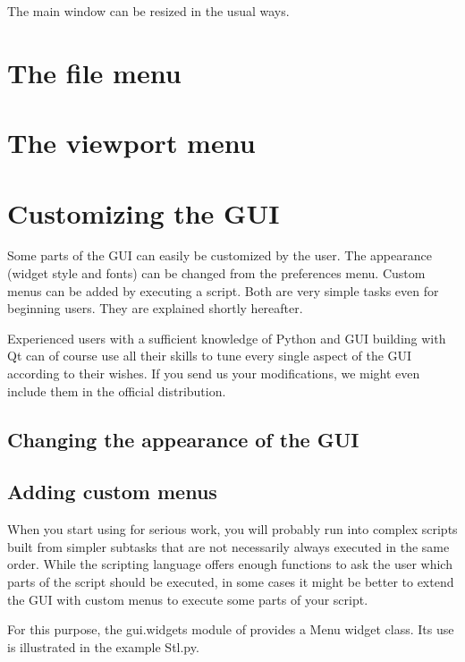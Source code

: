The \pyf main window can be resized in the usual ways. 

   
\section{The file menu}
\label{sec:file-menu}


   
\section{The viewport menu}
\label{sec:viewport-menu}



\section{Customizing the GUI}
\label{sec:customize-gui}

Some parts of the \pyformex GUI can easily be customized by the user. 
The appearance (widget style and fonts) can be changed from the preferences menu. Custom menus can be added by executing a script. Both are very simple tasks even for beginning users. They are explained shortly hereafter.

Experienced users with a sufficient knowledge of Python and GUI building with Qt can of course use all their skills to tune every single aspect of the \pyformex GUI according to their wishes. If you send us your modifications, we might even include them in the official distribution.


\subsection{Changing the appearance of the GUI}
\label{sec:chang-appe-gui}


\subsection{Adding custom menus}
\label{sec:adding-custom-menus}

When you start using \pyformex for serious work, you will probably run into complex scripts built from simpler subtasks that are not necessarily always executed in the same order. While the \pyformex scripting language offers enough functions to ask the user which parts of the script should be executed, in some cases it might be better to extend the \pyformex GUI with custom menus to execute some parts of your script.

For this purpose, the gui.widgets module of \pyformex provides a Menu widget class. Its use is illustrated in the example Stl.py.

